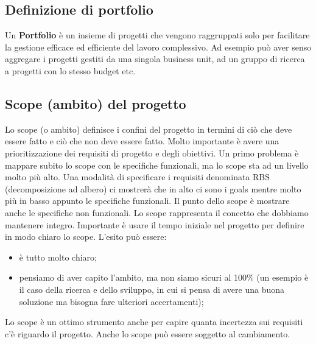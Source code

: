 \subsection{Definizione di portfolio}
Un \textbf{Portfolio} è un insieme di progetti che vengono raggruppati solo per facilitare la gestione efficace ed efficiente del lavoro complessivo. Ad esempio può aver senso aggregare i progetti gestiti da una singola business unit, ad un gruppo di ricerca a progetti con lo stesso budget etc.\newline
{}
\subsection{Scope (ambito) del progetto}
Lo scope (o ambito) definisce i confini del progetto in termini di ciò che deve essere fatto e ciò che non deve essere fatto.\newline
Molto importante è avere una prioritizzazione dei requisiti di progetto e degli obiettivi.\newline
Un primo problema è mappare subito lo scope con le specifiche funzionali, ma lo scope sta ad un livello molto più alto. Una modalità di specificare i requisiti denominata RBS (decomposizione ad albero) ci mostrerà che in alto ci sono i goals mentre molto più in basso appunto le specifiche funzionali. Il punto dello scope è mostrare anche le specifiche non funzionali.\newline
Lo scope rappresenta il concetto che dobbiamo mantenere integro. Importante è usare il tempo iniziale nel progetto per definire in modo chiaro lo scope. L'esito può essere:
\begin{itemize}
	\item è tutto molto chiaro;
	\item pensiamo di aver capito l'ambito, ma non siamo sicuri al 100\% (un esempio è il caso della ricerca e dello sviluppo, in cui si pensa di avere una buona soluzione ma bisogna fare ulteriori accertamenti);
\end{itemize}
Lo scope è un ottimo strumento anche per capire quanta incertezza sui requisiti c'è riguardo il progetto.\newline
Anche lo scope può essere soggetto al cambiamento.

